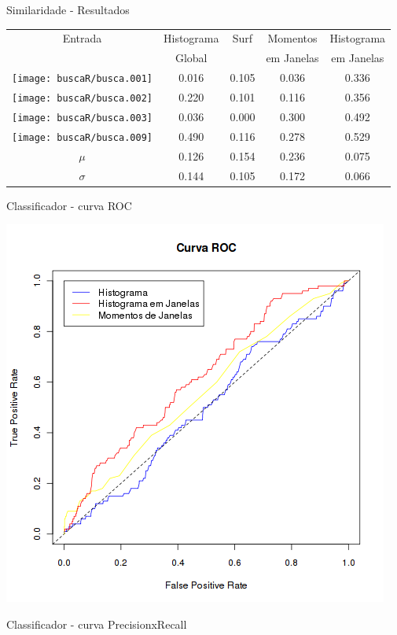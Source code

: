 \documentclass[
    style=paintings,
    paper=screen,
    blackslide,
    nopagebreaks,
    fleqn
]{powerdot}
\begin{document}
\begin{slide}{Similaridade - Resultados}
\vspace{-0.4cm}
\begin{table}[H]
\begin{center}
\begin{tabular}{|c| c | c | c | c |}
\hline
Entrada & Histograma & Surf &  Momentos  & Histograma \\
        &   Global   &      & em Janelas & em Janelas \\
\hline
\texttt{[image: buscaR/busca.001]} &
0.016 & 0.105 & 0.036 & 0.336 \\
\texttt{[image: buscaR/busca.002]} &
0.220 & 0.101 & 0.116 & 0.356 \\
\texttt{[image: buscaR/busca.003]} &
0.036 & 0.000 & 0.300 & 0.492 \\
\texttt{[image: buscaR/busca.009]} &
0.490 & 0.116 & 0.278 & 0.529 \\
\hline
$\mu$ & 0.126 & 0.154 & 0.236 & 0.075 \\
$\sigma$ & 0.144 & 0.105 & 0.172 & 0.066 \\
\hline
\end{tabular}
\end{center}
\end{table}
\end{slide}


\begin{slide}{Classificador - curva ROC}
\begin{center}
\includegraphics[width=0.65\linewidth]{curvaroc}
\end{center}
\end{slide}


\begin{slide}{Classificador - curva PrecisionxRecall}

\end{slide}
\end{document}

